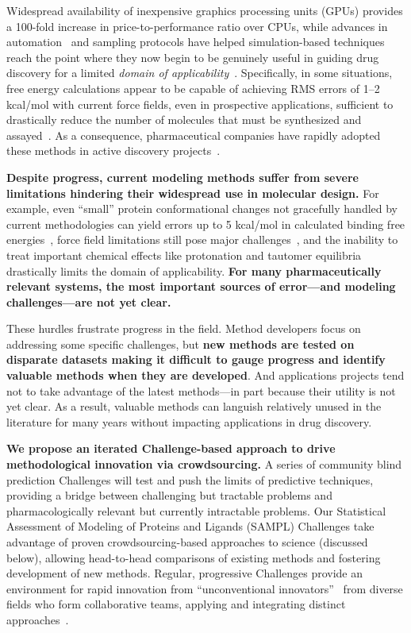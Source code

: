 \documentclass[11pt]{article}
\begin{document}
Widespread availability of inexpensive graphics processing units (GPUs) provides a 100-fold increase in price-to-performance ratio over CPUs, while advances in automation~\cite{liu_lead_2013} and sampling protocols have helped simulation-based techniques reach the point where they now begin to be genuinely useful in guiding drug discovery for a limited \emph{domain of applicability}~\cite{mikulskis_large-scale_2014, homeyer_binding_2014, Sherborne:2016:JComputAidedMolDes,  schrodinger_accurate_2015, christ_binding_2016, cui_affinity_2016, verras_free_2016}.
Specifically, in some situations, free energy calculations appear to be capable of achieving RMS errors of 1--2 kcal/mol with current force fields, even in prospective applications, sufficient to drastically reduce the number of molecules that must be synthesized and assayed~\cite{shirts_free-energy_2010, Aldeghi:2017:J.Am.Chem.Soc., schrodinger_accurate_2015}.
As a consequence, pharmaceutical companies have rapidly adopted these methods in active discovery projects~\cite{Sherborne:2016:JComputAidedMolDes}.

\textbf{Despite progress, current modeling methods suffer from severe limitations hindering their widespread use in molecular design.}
For example, even ``small'' protein conformational changes not gracefully handled by current methodologies can yield errors up to 5 kcal/mol in calculated binding free energies~\cite{lim_sensitivity_2016}, force field limitations still pose major challenges~\cite{rocklin_blind_2013}, and the inability to treat important chemical effects like protonation and tautomer equilibria drastically limits the domain of applicability.
{\bf For many pharmaceutically relevant systems, the most important sources of error---and modeling challenges---are not yet clear.~\cite{Sherborne:2016:JComputAidedMolDes}}

These hurdles frustrate progress in the field. 
Method developers focus on addressing some specific challenges, but {\bf new methods are tested on disparate datasets making it difficult to gauge progress and identify valuable methods when they are developed}.
And applications projects tend not to take advantage of the latest methods---in part because their utility is not yet clear. 
As a result, valuable methods can languish relatively unused in the literature for many years without impacting applications in drug discovery.

{\bf We propose an iterated Challenge-based approach to drive methodological innovation via crowdsourcing.} 
A series of community blind prediction Challenges will test and push the limits of predictive techniques, providing a bridge between challenging but tractable problems and pharmacologically relevant but currently intractable problems.
Our Statistical Assessment of Modeling of Proteins and Ligands (SAMPL) Challenges take advantage of proven crowdsourcing-based approaches to science (discussed below), allowing head-to-head comparisons of existing methods and fostering development of new methods.
Regular, progressive Challenges provide an environment for rapid innovation from ``unconventional innovators''~\cite{Kay:2011:R&DManage} from diverse fields who form collaborative teams, applying and integrating distinct approaches~\cite{Saez-Rodriguez:2016:NatRevGenet}.
\end{document}
